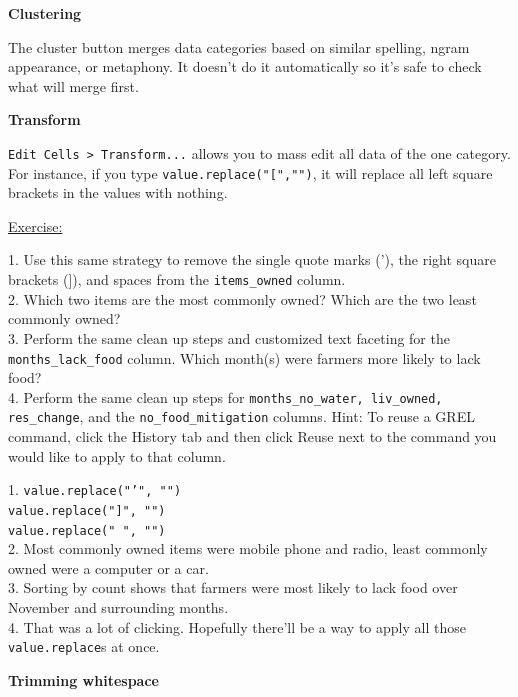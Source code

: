 \documentclass[12pt]{article}
\begin{document}
\vspace{1.5em}
\textbf{Clustering}

The cluster button merges data categories based on similar spelling, ngram appearance, or metaphony. It doesn't do it automatically so it's safe to check what will merge first.

\textbf{Transform}

\texttt{Edit Cells > Transform...} allows you to mass edit all data of the one category. For instance, if you type \texttt{value.replace("[","")}, it will replace all left square brackets in the values with nothing.

\vspace{1em}
\begin{addmargin}[1cm]{0cm}
\color{gray}
\underline{Exercise:}

1. Use this same strategy to remove the single quote marks ('), the right square brackets (]), and spaces from the \texttt{items\_owned} column.
\\2. Which two items are the most commonly owned? Which are the two least commonly owned?
\\3. Perform the same clean up steps and customized text faceting for the \texttt{months\_lack\_food} column. Which month(s) were farmers more likely to lack food?
\\4. Perform the same clean up steps for \texttt{months\_no\_water, liv\_owned, res\_change}, and the \texttt{no\_food\_mitigation} columns. Hint: To reuse a GREL command, click the History tab and then click Reuse next to the command you would like to apply to that column.

\color{black}\vspace{1em}
1. \texttt{value.replace("'", "")
\\value.replace("]", "")
\\value.replace(" ", "")}
\\2. Most commonly owned items were mobile phone and radio, least commonly owned were a computer or a car.
\\3. Sorting by count shows that farmers were most likely to lack food over November and surrounding months.
\\4. That was a lot of clicking. Hopefully there'll be a way to apply all those \texttt{value.replace}s at once.

\end{addmargin}

\vspace{1em}
\textbf{Trimming whitespace}
\end{document}
